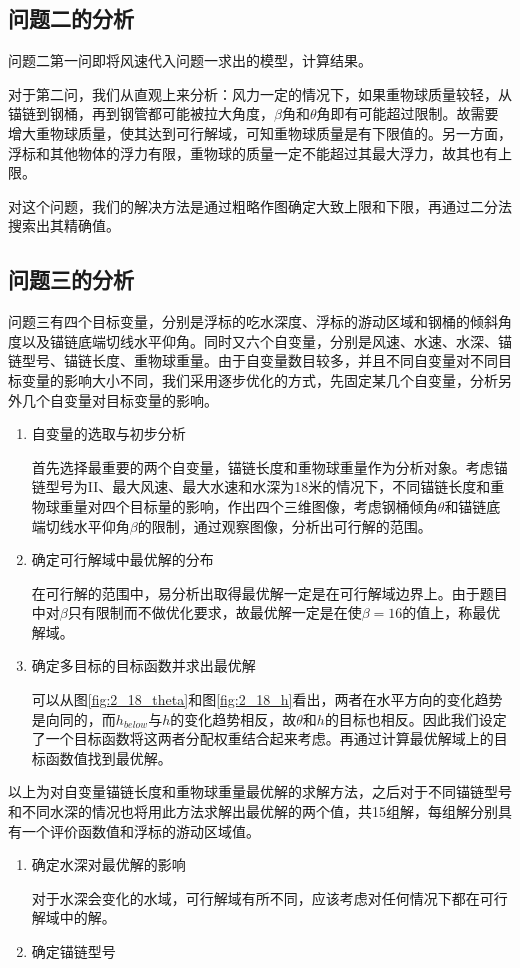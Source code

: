 \documentclass{cumcm}
\begin{document}
\subsection{问题二的分析}
问题二第一问即将风速代入问题一求出的模型，计算结果。\par 
对于第二问，我们从直观上来分析：风力一定的情况下，如果重物球质量较轻，从锚链到钢桶，再到钢管都可能被拉大角度，$\beta$角和$\theta$角即有可能超过限制。故需要增大重物球质量，使其达到可行解域，可知重物球质量是有下限值的。另一方面，浮标和其他物体的浮力有限，重物球的质量一定不能超过其最大浮力，故其也有上限。\par 
对这个问题，我们的解决方法是通过粗略作图确定大致上限和下限，再通过二分法搜索出其精确值。
\subsection{问题三的分析}
问题三有四个目标变量，分别是浮标的吃水深度、浮标的游动区域和钢桶的倾斜角度以及锚链底端切线水平仰角。同时又六个自变量，分别是风速、水速、水深、锚链型号、锚链长度、重物球重量。由于自变量数目较多，并且不同自变量对不同目标变量的影响大小不同，我们采用逐步优化的方式，先固定某几个自变量，分析另外几个自变量对目标变量的影响。\par
\begin{enumerate}
	\item 自变量的选取与初步分析 \par 
	首先选择最重要的两个自变量，锚链长度和重物球重量作为分析对象。考虑锚链型号为II、最大风速、最大水速和水深为18米的情况下，不同锚链长度和重物球重量对四个目标量的影响，作出四个三维图像，考虑钢桶倾角$\theta$和锚链底端切线水平仰角$\beta$的限制，通过观察图像，分析出可行解的范围。\par 
	\item 确定可行解域中最优解的分布\par 
	在可行解的范围中，易分析出取得最优解一定是在可行解域边界上。由于题目中对$\beta$只有限制而不做优化要求，故最优解一定是在使$\beta =16$的值上，称最优解域。\par 
	\item 确定多目标的目标函数并求出最优解\par 
	可以从图\ref{fig:2_18_theta}和图\ref{fig:2_18_h}看出，两者在水平方向的变化趋势是向同的，而$h_{below}$与$h$的变化趋势相反，故$\theta$和$h$的目标也相反。因此我们设定了一个目标函数将这两者分配权重结合起来考虑。再通过计算最优解域上的目标函数值找到最优解。
\end{enumerate}\par 
以上为对自变量锚链长度和重物球重量最优解的求解方法，之后对于不同锚链型号和不同水深的情况也将用此方法求解出最优解的两个值，共15组解，每组解分别具有一个评价函数值和浮标的游动区域值。\par
\begin{enumerate}
	\item 确定水深对最优解的影响\par 
	对于水深会变化的水域，可行解域有所不同，应该考虑对任何情况下都在可行解域中的解。\par 
	\item 确定锚链型号\par 
	
\end{enumerate}
\end{document}
